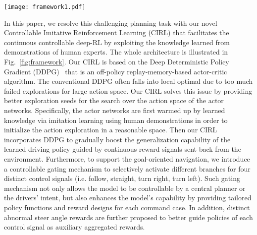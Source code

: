 \documentclass[runningheads]{llncs}
\begin{document}
\begin{figure*}[!tp]
        \begin{center}
            \texttt{[image: framework1.pdf]}\vspace{-3mm}
            \caption{An overview of our Controllable Imitative Reinforcement Learning (CIRL), including a controllable imitation stage and a reinforcement learning stage optimized via Deep Deterministic Policy Gradient (DDPG). The imitation stage first train the network by supervised learning with groundtruth actions from recorded human driving videos. Then we share the learned weights into the actor network and optimize both actor and critic with feedbacks from reward module by interacting with the simulator.} \vspace{-8mm}
            \label{fig:framework}
        \end{center}
    \end{figure*}
    
In this paper, we resolve this challenging planning task with our novel Controllable Imitative Reinforcement Learning (CIRL) that facilitates the continuous controllable deep-RL by exploiting the knowledge learned from demonstrations of human experts. The whole architecture is illustrated in Fig.~\ref{fig:framework}. Our CIRL is based on the Deep Deterministic Policy Gradient (DDPG)~\cite{lillicrap2015continuous} that is an off-policy replay-memory-based actor-critic algorithm. The conventional DDPG often falls into local optimal due to too much failed explorations for large action space. Our CIRL solves this issue by providing better exploration seeds for the search over the action space of the actor networks. Specifically, the actor networks are first warmed up by learned knowledge via imitation learning using human demonstrations in order to initialize the action exploration in a reasonable space. Then our CIRL incorporates DDPG to gradually boost the generalization capability of the learned driving policy guided by continuous reward signals sent back from the environment. 
Furthermore, to support the goal-oriented navigation, we introduce a controllable gating mechanism to selectively activate different branches for four distinct control signals (i.e. follow, straight, turn right, turn left). Such gating mechanism not only allows the model to be controllable by a central planner or the drivers' intent, but also enhances the model's capability by providing tailored policy functions and reward designs for each command case. In addition, distinct abnormal steer angle rewards are further proposed to better guide policies of each control signal as auxiliary aggregated rewards. 
\end{document}
